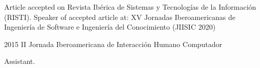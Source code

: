 \documentclass[american]{cv-class}
\begin{document}
\begin{entrylist}
	{\justifying Article accepted on Revista Ibérica de Sistemas y Tecnologías de la Información (RISTI). Speaker of accepted article at: XV Jornadas Iberoamericanas de Ingeniería de Software e Ingeniería del Conocimiento (JIISIC 2020) \\
	{\href{https://bit.ly/36BxP2W}{}}
	}
	
	\entry
	{2015}
	{II Jornada Iberoamericana de Interacción Humano Computador}
	{}
	{Assistant.
		    
	{\href{https://bit.ly/2UiQBGx}{}}
	}
\end{entrylist}
\end{document}

